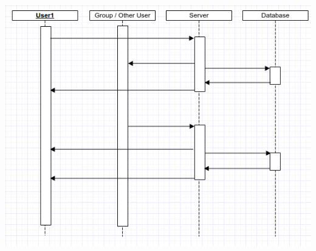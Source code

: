 \documentclass{scrreprt}
\begin{document}
\begin{center}
\includegraphics[scale=.8]{sequence}
\end{center}
\end{document}
